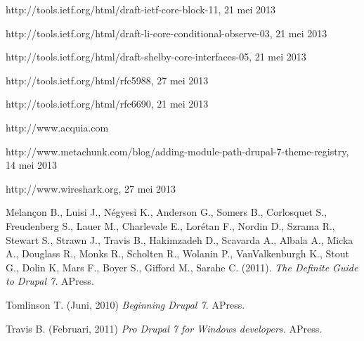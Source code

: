 \begin{thebibliography}{99}
 http://tools.ietf.org/html/draft-ietf-core-block-11, 21 mei 2013

 http://tools.ietf.org/html/draft-li-core-conditional-observe-03, 21 mei 2013

 http://tools.ietf.org/html/draft-shelby-core-interfaces-05, 21 mei 2013

 http://tools.ietf.org/html/rfc5988, 27 mei 2013

 http://tools.ietf.org/html/rfc6690, 21 mei 2013

 http://www.acquia.com

 http://www.metachunk.com/blog/adding-module-path-drupal-7-theme-registry, 14 mei 2013

 http://www.wireshark.org, 27 mei 2013

 Melançon B., Luisi J., Négyesi K., Anderson G., Somers B., Corlosquet S., Freudenberg S., Lauer M., Charlevale E., Lorétan F., Nordin D., Szrama R., Stewart S., Strawn J., Travis B., Hakimzadeh D., Scavarda A., Albala A., Micka A., Douglass R., Monks R., Scholten R., Wolanin P., VanValkenburgh K., Stout G., Dolin K, Mars F., Boyer S., Gifford M., Sarahe C. (2011). {\em The Definite Guide to Drupal 7.} APress.

 Tomlinson T. (Juni, 2010) {\em Beginning Drupal 7.} APress.

 Travis B. (Februari, 2011) {\em Pro Drupal 7 for Windows developers.} APress.

\end{thebibliography}

